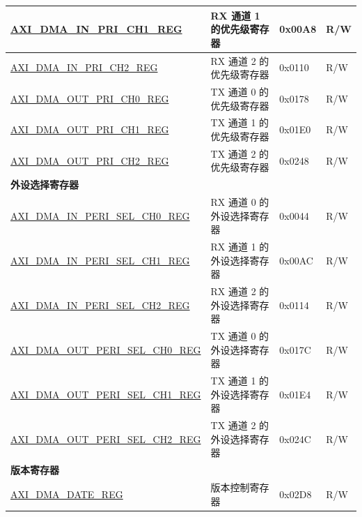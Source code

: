 \begin{longtable}{ | l | l | p{1.3cm} | l | }
\hyperref[regdesc:AXIDMAINPRICHNREG]{AXI\_DMA\_IN\_PRI\_CH1\_REG} & RX 通道 1 的优先级寄存器 & 0x00A8 & R/W \\ \hline
\hyperref[regdesc:AXIDMAINPRICHNREG]{AXI\_DMA\_IN\_PRI\_CH2\_REG} & RX 通道 2 的优先级寄存器 & 0x0110 & R/W \\ \hline
\hyperref[regdesc:AXIDMAOUTPRICHNREG]{AXI\_DMA\_OUT\_PRI\_CH0\_REG} & TX 通道 0 的优先级寄存器 & 0x0178 & R/W \\ \hline
\hyperref[regdesc:AXIDMAOUTPRICHNREG]{AXI\_DMA\_OUT\_PRI\_CH1\_REG} & TX 通道 1 的优先级寄存器 & 0x01E0 & R/W \\ \hline
\hyperref[regdesc:AXIDMAOUTPRICHNREG]{AXI\_DMA\_OUT\_PRI\_CH2\_REG} & TX 通道 2 的优先级寄存器 & 0x0248 & R/W \\ \hline
\multicolumn{4}{|l|}{\textbf{外设选择寄存器}} \\ \hline
\hyperref[regdesc:AXIDMAINPERISELCHNREG]{AXI\_DMA\_IN\_PERI\_SEL\_CH0\_REG} & RX 通道 0 的外设选择寄存器 & 0x0044 & R/W \\ \hline
\hyperref[regdesc:AXIDMAINPERISELCHNREG]{AXI\_DMA\_IN\_PERI\_SEL\_CH1\_REG} & RX 通道 1 的外设选择寄存器 & 0x00AC & R/W \\ \hline
\hyperref[regdesc:AXIDMAINPERISELCHNREG]{AXI\_DMA\_IN\_PERI\_SEL\_CH2\_REG} & RX 通道 2 的外设选择寄存器 & 0x0114 & R/W \\ \hline
\hyperref[regdesc:AXIDMAOUTPERISELCHNREG]{AXI\_DMA\_OUT\_PERI\_SEL\_CH0\_REG} & TX 通道 0 的外设选择寄存器 & 0x017C & R/W \\ \hline
\hyperref[regdesc:AXIDMAOUTPERISELCHNREG]{AXI\_DMA\_OUT\_PERI\_SEL\_CH1\_REG} & TX 通道 1 的外设选择寄存器 & 0x01E4 & R/W \\ \hline
\hyperref[regdesc:AXIDMAOUTPERISELCHNREG]{AXI\_DMA\_OUT\_PERI\_SEL\_CH2\_REG} & TX 通道 2 的外设选择寄存器 & 0x024C & R/W \\ \hline
\multicolumn{4}{|l|}{\textbf{版本寄存器}} \\ \hline
\hyperref[regdesc:AXIDMADATEREG]{AXI\_DMA\_DATE\_REG} & 版本控制寄存器 & 0x02D8 & R/W \\ \hline
\end{longtable}
